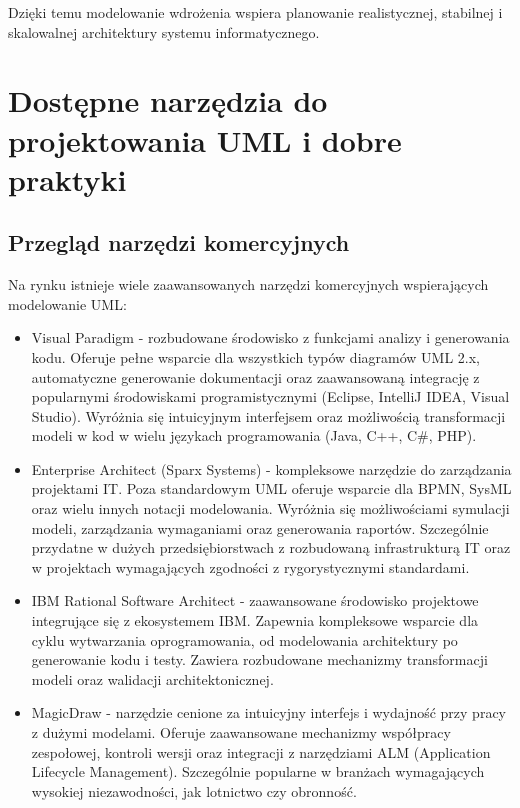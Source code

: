 \documentclass[12pt,a4paper]{article}
\begin{document}
Dzięki temu modelowanie wdrożenia wspiera planowanie realistycznej, stabilnej i skalowalnej architektury systemu informatycznego.

\section{Dostępne narzędzia do projektowania UML i dobre praktyki}

\subsection{Przegląd narzędzi komercyjnych}
Na rynku istnieje wiele zaawansowanych narzędzi komercyjnych wspierających modelowanie UML:

\begin{itemize}
    \item Visual Paradigm - rozbudowane środowisko z funkcjami analizy i generowania kodu. Oferuje pełne wsparcie dla wszystkich typów diagramów UML 2.x, automatyczne generowanie dokumentacji oraz zaawansowaną integrację z popularnymi środowiskami programistycznymi (Eclipse, IntelliJ IDEA, Visual Studio). Wyróżnia się intuicyjnym interfejsem oraz możliwością transformacji modeli w kod w wielu językach programowania (Java, C++, C\#, PHP).
    
    \item Enterprise Architect (Sparx Systems) - kompleksowe narzędzie do zarządzania projektami IT. Poza standardowym UML oferuje wsparcie dla BPMN, SysML oraz wielu innych notacji modelowania. Wyróżnia się możliwościami symulacji modeli, zarządzania wymaganiami oraz generowania raportów. Szczególnie przydatne w dużych przedsiębiorstwach z rozbudowaną infrastrukturą IT oraz w projektach wymagających zgodności z rygorystycznymi standardami.
    
    \item IBM Rational Software Architect - zaawansowane środowisko projektowe integrujące się z ekosystemem IBM. Zapewnia kompleksowe wsparcie dla cyklu wytwarzania oprogramowania, od modelowania architektury po generowanie kodu i testy. Zawiera rozbudowane mechanizmy transformacji modeli oraz walidacji architektonicznej.
    
    \item MagicDraw - narzędzie cenione za intuicyjny interfejs i wydajność przy pracy z dużymi modelami. Oferuje zaawansowane mechanizmy współpracy zespołowej, kontroli wersji oraz integracji z narzędziami ALM (Application Lifecycle Management). Szczególnie popularne w branżach wymagających wysokiej niezawodności, jak lotnictwo czy obronność.
\end{itemize}
\end{document}
